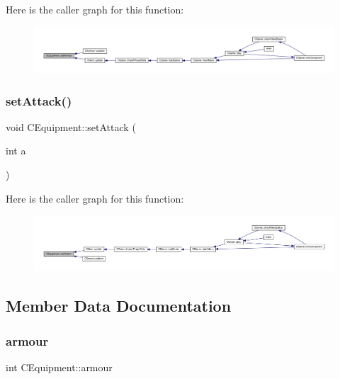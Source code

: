 Here is the caller graph for this function\+:\nopagebreak
\begin{figure}[H]
\begin{center}
\leavevmode
\includegraphics[width=350pt]{class_c_equipment_a223e0e1172975f9d9c49612b2513afb0_icgraph}
\end{center}
\end{figure}
\mbox{\label{class_c_equipment_abf42868d8cd5d627d872dbf7f80bff9a}} 
\subsubsection{\texorpdfstring{set\+Attack()}{setAttack()}}
{\footnotesize\ttfamily void C\+Equipment\+::set\+Attack (\begin{DoxyParamCaption}\item[{int}]{a }\end{DoxyParamCaption})\hspace{0.3cm}{\ttfamily [inline]}}

Here is the caller graph for this function\+:\nopagebreak
\begin{figure}[H]
\begin{center}
\leavevmode
\includegraphics[width=350pt]{class_c_equipment_abf42868d8cd5d627d872dbf7f80bff9a_icgraph}
\end{center}
\end{figure}


\subsection{Member Data Documentation}
\mbox{\label{class_c_equipment_ac81cce3ea702ab56bf778b8ed9e650c7}} 
\subsubsection{\texorpdfstring{armour}{armour}}
{\footnotesize\ttfamily int C\+Equipment\+::armour\hspace{0.3cm}{\ttfamily [protected]}}

